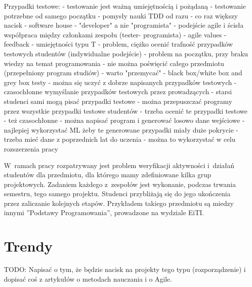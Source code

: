 Przypadki testowe:
	- testowanie jest ważną umiejętnością i pożądaną
	- testowanie potrzebne od samego początku
	- pomysły nauki TDD od razu
	- co raz większy nacisk
	- software house - "developer" a nie "programista"
	- podejście agile i ścisła współpraca między członkami zespołu (tester- programista)
	- agile values - feedback
	- umiejętności typu T
	- problem, ciężko ocenić trafność przypadków testowych studentów (indywidualne podejście)
	- problem na początku, przy braku wiedzy na temat programowania
	- nie można poświęcić całego przedmiotu (przepełniony program studiów)
	- warto "przemycać"
	- black box/white box and grey box testy
	- można się uczyć z dobrze napisanych przypadków testowych
	- czasochłonne wymyślanie przypadków testowych przez prowadzących
	- starsi studenci sami mogą pisać przypadki testowe
	- można przepuszczać programy przez wszystkie przypadki testowe studentów
	- trzeba ocenić te przypadki testowe - też czasochłonne
	- można napisać program i generować losowo dane wejściowe
	- najlepiej wykorzystać ML żeby te generowane przypadki miały duże pokrycie
	- trzeba mieć dane z poprzednich lat do uczenia
	- można to wykorzystać w celu rozszerzenia pracy




W~ramach pracy rozpatrywany jest problem weryfikacji aktywności i~działań studentów dla przedmiotu, dla którego mamy zdefiniowane kilka grup projektowych.
Zadaniem każdego z~zespołów jest wykonanie, podczas trwania semestru, tego samego projektu.
Studenci przybliżają się do jego ukończenia przez zaliczanie kolejnych etapów.
Przykładem takiego przedmiotu są miedzy innymi ”Podstawy Programowania”, prowadzone na wydziale EiTI.

\section{Trendy}

TODO:
Napisać o tym, że będzie nacisk na projekty tego typu (rozporządzenie) i dopisać coś z artykułów o metodach nauczania i o Agile.

